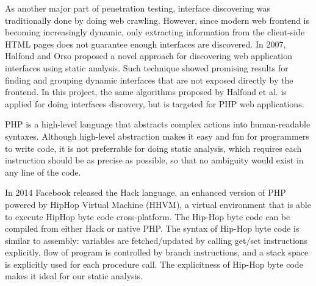 As another major part of penetration testing, interface discovering was traditionally done by doing web crawling. However, since modern web frontend is becoming increasingly dynamic, only extracting information from the client-side HTML pages does not guarantee enough interfaces are discovered. In 2007, Halfond and Orso \cite{ref3} proposed a novel approach for discovering web application interfaces using static analysis. Such technique showed promising results for finding and grouping dynamic interfaces that are not exposed directly by the frontend.
In this project, the same algorithms proposed by Halfond et al. is applied for doing interfaces discovery, but is targeted for PHP web applications.

PHP is a high-level language that abstracts complex actions into human-readable syntaxes. Although high-level abstraction makes it easy and fun for programmers to write code, it is not preferrable for doing static analysis, which requires each instruction should be as precise as possible, so that no ambiguity would exist in any line of the code.

In 2014 Facebook released the Hack language, an enhanced version of PHP powered by HipHop Virtual Machine (HHVM), a virtual environment that is able to execute HipHop byte code cross-platform. The Hip-Hop byte code can be compiled from either Hack or native PHP. The syntax of Hip-Hop byte code is similar to assembly: variables are fetched/updated by calling get/set instructions explicitly, flow of program is controlled by branch instructions, and a stack space is explicitly used for each procedure call. The explicitness of Hip-Hop byte code makes it ideal for our static analysis.



